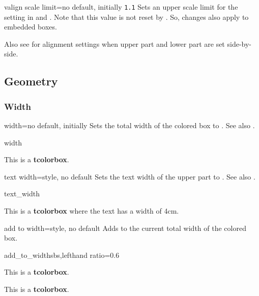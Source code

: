 \begin{docTcbKey}[][doc new=2015-07-16]{valign scale limit}{=}{no default, initially \texttt{1.1}}
  Sets an upper scale limit for the  setting in
   and .
  Note that this value is not reset by . So, changes
  also apply to embedded boxes.
\end{docTcbKey}


Also see  for alignment settings when
upper part and lower part are set side-by-side.

\clearpage
\subsection{Geometry}
\subsubsection{Width}

\begin{docTcbKey}{width}{=}{no default, initially }
  Sets the total width of the colored box to .
  See also .
\begin{exdispExample}{width}

\begin{tcolorbox}[width=\linewidth/2]
This is a \textbf{tcolorbox}.
\end{tcolorbox}
\end{exdispExample}
\end{docTcbKey}


\begin{docTcbKey}[][doc new=2014-10-31]{text width}{=}{style, no default}
  Sets the text width of the upper part to .
  See also .
\begin{exdispExample}{text_width}

\begin{tcolorbox}[text width=4cm]
This is a \textbf{tcolorbox} where the text has a width of 4cm.
\end{tcolorbox}
\end{exdispExample}
\end{docTcbKey}

\begin{docTcbKey}[][doc new=2014-11-07]{add to width}{=}{style, no default}
  Adds  to the current total width of the colored box.
\begin{exdispExample*}{add_to_width}{sbs,lefthand ratio=0.6}

\begin{tcolorbox}
This is a \textbf{tcolorbox}.
\end{tcolorbox}

\begin{tcolorbox}[add to width=1cm]
This is a \textbf{tcolorbox}.
\end{tcolorbox}
\end{exdispExample*}
\end{docTcbKey}


